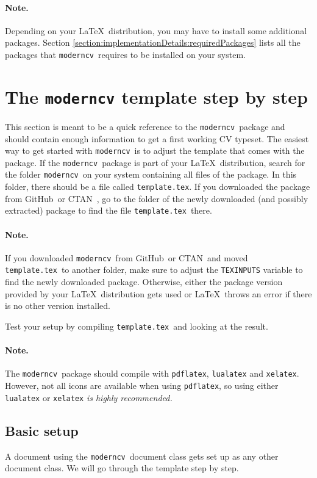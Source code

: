 \documentclass[a4paper, 11pt]{article}
\newcommand{\code}[1]{\lstinline!#1!}
\newcommand{\moderncv}{\code{moderncv}}
\newcommand{\Moderncv}{\moderncv~}
\newcommand{\github}{GitHub}
\newcommand{\Github}{\github~}
\newcommand{\ctan}{CTAN}
\newcommand{\Ctan}{\ctan~}
\newcommand{\cvtemplate}{\code{template.tex}}
\newcommand{\Cvtemplate}{\cvtemplate~}
\newcommand{\Latex}{\LaTeX~}
\begin{document}
\paragraph{Note.}
Depending on your \Latex distribution, you may have to install some additional packages.
Section \ref{section:implementationDetails:requiredPackages} lists all the packages that \Moderncv requires to be installed on your system.



\section{The \texttt{moderncv} template step by step}
This section is meant to be a quick reference to the \Moderncv package and should contain enough information to get a first working CV typeset.
\label{section:moderncvTemplate}
The easiest way to get started with \Moderncv is to adjust the template that comes with the package.
If the \Moderncv package is part of your \Latex distribution, search for the folder \Moderncv on your system containing all files of the package.
In this folder, there should be a file called \cvtemplate.
If you downloaded the package from \Github or \Ctan, go to the folder of the newly downloaded (and possibly extracted) package to find the file \Cvtemplate there.

\paragraph{Note.}
If you downloaded \Moderncv from \Github or \Ctan and moved \Cvtemplate to another folder, make sure to adjust the \code{TEXINPUTS} variable to find the newly downloaded package.
Otherwise, either the package version provided by your \Latex distribution gets used or \Latex throws an error if there is no other version installed.

Test your setup by compiling \Cvtemplate and looking at the result.

\paragraph{Note.} The \Moderncv package should compile with \code{pdflatex}, \code{lualatex} and \code{xelatex}.
However, not all icons are available when using \code{pdflatex}, so using either \code{lualatex} or \code{xelatex} \emph{is highly recommended.}

\subsection{Basic setup}
A document using the \Moderncv document class gets set up as any other document class.
We will go through the template step by step.
\end{document}
